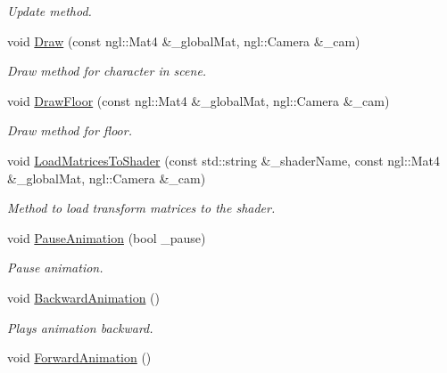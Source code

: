 \begin{DoxyCompactItemize}
\begin{DoxyCompactList}\small\item\em Update method. \end{DoxyCompactList}\item 
void \hyperlink{class_b_v_h_scene_a405f59e41378e5c758937281657947d9}{Draw} (const ngl\+::\+Mat4 \&\+\_\+global\+Mat, ngl\+::\+Camera \&\+\_\+cam)
\begin{DoxyCompactList}\small\item\em Draw method for character in scene. \end{DoxyCompactList}\item 
void \hyperlink{class_b_v_h_scene_ab01f9d83c1a35b25c9264ad92665522d}{Draw\+Floor} (const ngl\+::\+Mat4 \&\+\_\+global\+Mat, ngl\+::\+Camera \&\+\_\+cam)
\begin{DoxyCompactList}\small\item\em Draw method for floor. \end{DoxyCompactList}\item 
void \hyperlink{class_b_v_h_scene_aed67a997059b478b6088c353ec1d2b2b}{Load\+Matrices\+To\+Shader} (const std\+::string \&\+\_\+shader\+Name, const ngl\+::\+Mat4 \&\+\_\+global\+Mat, ngl\+::\+Camera \&\+\_\+cam)
\begin{DoxyCompactList}\small\item\em Method to load transform matrices to the shader. \end{DoxyCompactList}\item 
void \hyperlink{class_b_v_h_scene_a13167e9a975771835a90be852204c991}{Pause\+Animation} (bool \+\_\+pause)
\begin{DoxyCompactList}\small\item\em Pause animation. \end{DoxyCompactList}\item 
void \hyperlink{class_b_v_h_scene_a2dff242957eee4796190dd1bf71b2b4e}{Backward\+Animation} ()\hypertarget{class_b_v_h_scene_a2dff242957eee4796190dd1bf71b2b4e}{}\label{class_b_v_h_scene_a2dff242957eee4796190dd1bf71b2b4e}

\begin{DoxyCompactList}\small\item\em Plays animation backward. \end{DoxyCompactList}\item 
void \hyperlink{class_b_v_h_scene_a4df83466d8f033064a49f177cd6a496d}{Forward\+Animation} ()\hypertarget{class_b_v_h_scene_a4df83466d8f033064a49f177cd6a496d}{}\label{class_b_v_h_scene_a4df83466d8f033064a49f177cd6a496d}


\end{DoxyCompactItemize}
